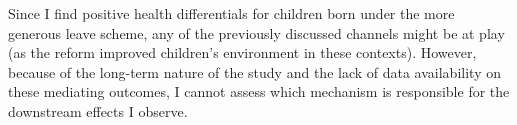 \documentclass[11pt, a4paper, draft]{article} %
\begin{document}



Since I find positive health differentials for children born under the more generous leave scheme, any of the previously discussed channels might be at play (as the reform improved children's environment in these contexts). However, because of the long-term nature of the study and the lack of data availability on these mediating outcomes, I cannot assess which mechanism is responsible for the downstream effects I observe.








\end{document}
